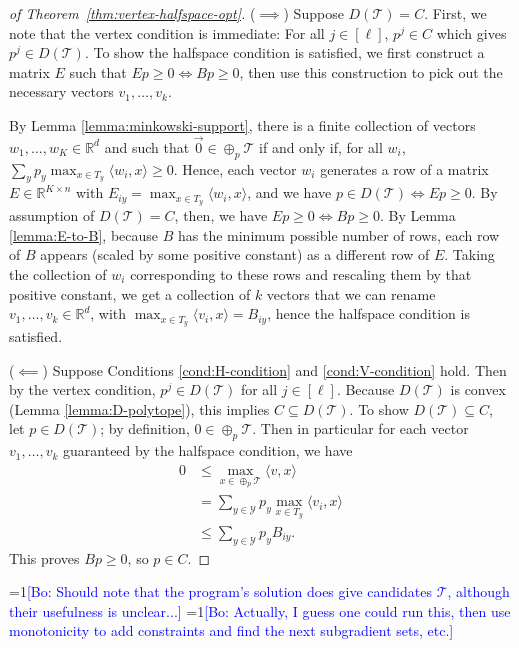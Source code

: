 \documentclass[anon]{colt2020} %
\newcommand{\Comments}{1}
\newcommand{\mynote}[2]{\ifnum\Comments=1\textcolor{#1}{#2}\fi}
\newcommand{\bo}[1]{\mynote{blue}{[Bo: #1]}}
\newcommand{\reals}{\mathbb{R}}
\newcommand{\T}{\mathcal{T}}
\newcommand{\Y}{\mathcal{Y}}
\newcommand{\inprod}[2]{\langle #1, #2 \rangle}%
\begin{document}
\begin{proof}[of Theorem~\ref{thm:vertex-halfspace-opt}]
  ($\implies$)
  Suppose $D(\T) = C$.
  First, we note that the vertex condition is immediate: For all $j \in [\ell]$, $p^j \in C$ which gives $p^j \in D(\T)$.
  To show the halfspace condition is satisfied, we first construct a matrix $E$ such that $Ep \geq 0 \iff Bp \geq 0$, then use this construction to pick out the necessary vectors $v_1,\dots,v_k$.

  By Lemma \ref{lemma:minkowski-support}, there is a finite collection of vectors $w_1,\dots,w_{K} \in \reals^d$ and such that $\vec 0 \in \oplus_p \T$ if and only if, for all $w_i$, $\sum_y p_y \max_{x \in T_y} \inprod{w_i}{x} \geq 0$.
  Hence, each vector $w_i$ generates a row of a matrix $E \in \reals^{K \times n}$ with $E_{iy} = \max_{x \in T_y} \inprod{w_i}{x}$, and we have $p \in D(\T) \iff Ep \geq 0$.
  By assumption of $D(\T) = C$, then, we have $Ep \geq 0 \iff Bp \geq 0$.
  By Lemma \ref{lemma:E-to-B}, because $B$ has the minimum possible number of rows, each row of $B$ appears (scaled by some positive constant) as a different row of $E$. Taking the collection of $w_i$ corresponding to these rows and rescaling them by that positive constant, we get a collection of $k$ vectors that we can rename $v_1,\ldots,v_k \in \reals^d$, with $\max_{x \in T_y} \inprod{v_i}{x} = B_{iy}$, hence the halfspace condition is satisfied.

  ($\impliedby$)
  Suppose Conditions \ref{cond:H-condition} and \ref{cond:V-condition} hold.
  Then by the vertex condition, $p^j \in D(\T)$ for all $j \in [\ell]$.
  Because $D(\T)$ is convex (Lemma \ref{lemma:D-polytope}), this implies $C \subseteq D(\T)$.
  To show $D(\T) \subseteq C$, let $p \in D(\T)$; by definition, $0 \in \oplus_p \T$.
  Then in particular for each vector $v_1,\ldots,v_k$ guaranteed by the halfspace condition, we have
  \begin{align*}
    0 &\leq \max_{x \in \oplus_p \T} \inprod{v}{x}  \\
      &=    \sum_{y \in \Y} p_y \max_{x \in T_y} \inprod{v_i}{x}  \\
      &\leq \sum_{y \in \Y} p_y B_{iy} .
  \end{align*}
  This proves $Bp \geq 0$, so $p \in C$.
\end{proof}

\bo{Should note that the program's solution does give candidates $\T$, although their usefulness is unclear...}
\bo{Actually, I guess one could run this, then use monotonicity to add constraints and find the next subgradient sets, etc.}
\end{document}
